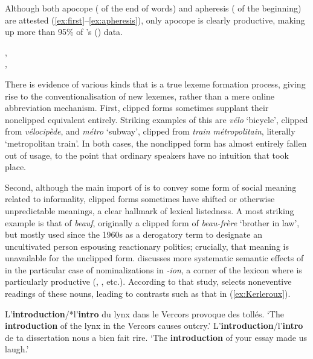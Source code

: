 \documentclass[output=paper,colorlinks,citecolor=brown]{langscibook}
\begin{document}
Although both apocope ( of the end of words) and apheresis ( of the beginning) are attested (\ref{ex:first}--\ref{ex:apheresis}), only apocope is clearly productive, making up more than 95\% of  \citeauthor{antoine2000}'s (\citeyear{antoine2000}) data. 

\begin{exe}
	\ex\label{ex:apheresis} ,\\ ,\\ 
\end{exe}

There is evidence of various kinds that  is a true lexeme formation process, giving rise to the conventionalisation of new lexemes, rather than a mere online abbreviation mechanism. First, clipped forms sometimes supplant their nonclipped equivalent entirely. Striking examples of this are \emph{vélo} ‘bicycle’, clipped from \emph{vélocipède}, and \emph{métro} ‘subway’, clipped from \emph{train métropolitain}, literally ‘metropolitan train’. In both cases, the nonclipped form has almost entirely fallen out of usage,  to the point that ordinary speakers have no intuition that  took place.

\largerpage[1]

Second, although the main import of  is to convey some form of social meaning related to informality, clipped forms sometimes have shifted or otherwise unpredictable meanings, a clear hallmark of lexical listedness. A most striking example is that of \emph{beauf}, originally a clipped form of \emph{beau-frère} ‘brother in law’, but mostly used since the 1960s as a derogatory term to designate an uncultivated person espousing reactionary politics; crucially, that meaning is unavailable for the unclipped form. \citet{kerleroux1999} discusses more systematic semantic effects of  in the particular case of nominalizations in \emph{-ion}, a corner of the lexicon where  is particularly productive (, , etc.). According to that study,  selects noneventive readings of these nouns, leading to contrasts such as that in (\ref{ex:Kerleroux}).

\begin{exe}
	\ex\label{ex:Kerleroux}\begin{xlist}
		\ex L'\textbf{introduction}/*l'\textbf{intro} du lynx dans le Vercors provoque des tollés.
		\trans ‘The \textbf{introduction} of the lynx in the Vercors causes outcry.’
		\ex L'\textbf{introduction}/l'\textbf{intro} de ta dissertation nous a bien fait rire.
		\trans ‘The \textbf{introduction} of your essay made us laugh.’
	\end{xlist}
\end{exe}
\end{document}
